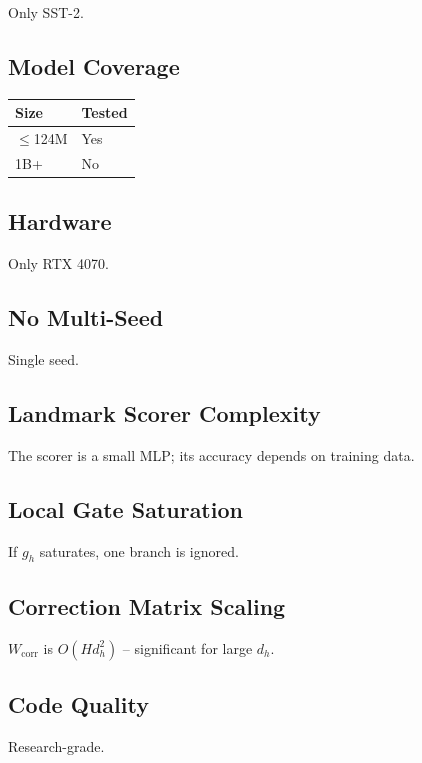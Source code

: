 Only SST-2.

\subsection{Model Coverage}

\begin{table}[H]
\centering
\small
\begin{tabular}{ll}
\toprule
\textbf{Size} & \textbf{Tested} \\
\midrule
$\le$124M & Yes \\
1B+ & No \\
\bottomrule
\end{tabular}
\end{table}

\subsection{Hardware}

Only RTX 4070.

\subsection{No Multi-Seed}

Single seed.

\subsection{Landmark Scorer Complexity}

The scorer is a small MLP; its accuracy depends on training data.

\subsection{Local Gate Saturation}

If $g_h$ saturates, one branch is ignored.

\subsection{Correction Matrix Scaling}

$W_\text{corr}$ is $O(H d_h^2)$ -- significant for large $d_h$.

\subsection{Code Quality}

Research-grade.

